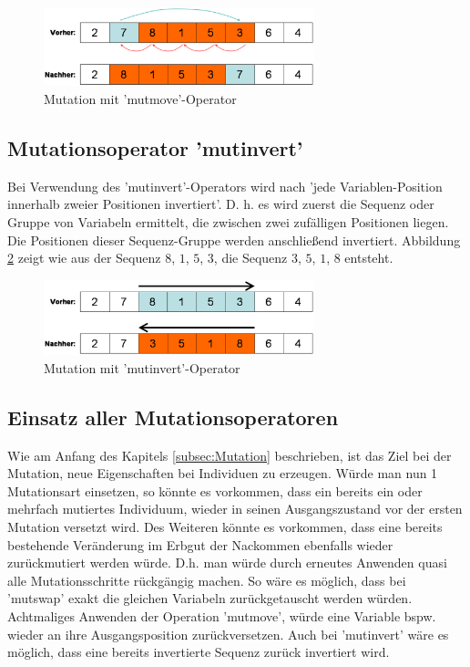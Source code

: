 \begin{figure} 
  \centering
  \includegraphics[width=0.7\textwidth]{../images/picMUTMOVE}
  \caption{Mutation mit 'mutmove'-Operator}
  \label{fig:MUTMOVE}
\end{figure}

\subsection{Mutationsoperator 'mutinvert'}
\label{subsec:mutinvert}
Bei Verwendung des 'mutinvert'-Operators wird nach
\cite{url:geatbx-documentation} 'jede Variablen-Position innerhalb
zweier Positionen invertiert'. D. h. es wird zuerst die Sequenz
oder Gruppe von Variabeln ermittelt, die zwischen zwei zufälligen
Positionen liegen. Die Positionen dieser Sequenz-Gruppe werden
anschließend invertiert. Abbildung \ref{fig:MUTINVERT} zeigt wie
aus der Sequenz $8$, $1$, $5$, $3$, die Sequenz $3$, $5$, $1$, $8$
entsteht.   

\begin{figure} 
  \centering
  \includegraphics[width=0.7\textwidth]{../images/picMUTINVERT}
  \caption{Mutation mit 'mutinvert'-Operator}
  \label{fig:MUTINVERT}
\end{figure}

\subsection{Einsatz aller Mutationsoperatoren}
\label{subsec:AlleMutationen}
Wie am Anfang des Kapitels \ref{subsec:Mutation} beschrieben, ist das
Ziel bei der Mutation, neue Eigenschaften bei Individuen zu erzeugen.
Würde man nun 1 Mutationsart einsetzen, so könnte es vorkommen, dass
ein bereits ein oder mehrfach mutiertes Individuum, wieder in seinen
Ausgangszustand vor der ersten Mutation versetzt wird. Des Weiteren
könnte es vorkommen, dass eine bereits bestehende Veränderung im Erbgut der
Nackommen ebenfalls wieder zurückmutiert werden würde. D.h. man
würde durch erneutes Anwenden quasi alle Mutationsschritte rückgängig machen.
So wäre es möglich, dass bei 'mutswap' exakt die gleichen Variabeln
zurückgetauscht werden würden. Achtmaliges Anwenden der Operation 
'mutmove', würde eine Variable bspw. wieder an ihre
Ausgangsposition zurückversetzen. Auch bei 'mutinvert' wäre es möglich,
dass eine bereits invertierte Sequenz zurück invertiert wird.

